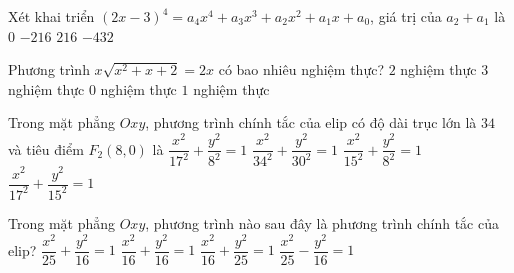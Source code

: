 \begin{ex}%
	Xét khai triển $(2 x-3)^4=a_4 x^4+a_3 x^3+a_2 x^2+a_1 x+a_0$, giá trị của $a_2+a_1$ là \choice
	{\True $0$}
	{$-216$} 
	{$216$} 
	{$-432$} 
\end{ex}
\begin{ex}%
	Phương trình $x \sqrt{x^2+x+2}=2 x$ có bao nhiêu nghiệm thực? \choice
	{$2$ nghiệm thực}
	{\True $3$ nghiệm thực}
	{$0$ nghiệm thực}
	{$1$ nghiệm thực}
\end{ex}

\begin{ex}%
	Trong mặt phẳng $O x y$, phương trình chính tắc của elip có độ dài trục lớn là $ 34 $ và tiêu điểm $F_2(8,0)$ là
	\choice
	{$\dfrac{x^2}{17^2}+\dfrac{y^2}{8^2}=1$}
	{$\dfrac{x^2}{34^2}+\dfrac{y^2}{30^2}=1$}
	{$\dfrac{x^2}{15^2}+\dfrac{y^2}{8^2}=1$}
	{\True$\dfrac{x^2}{17^2}+\dfrac{y^2}{15^2}=1$}
\end{ex}


\begin{ex}%
	Trong mặt phẳng $O x y$, phương trình nào sau đây là phương trình chính tắc của elip?
	\choice
	{\True$\dfrac{x^2}{25}+\dfrac{y^2}{16}=1$}
	{$\dfrac{x^2}{16}+\dfrac{y^2}{16}=1$}
	{$\dfrac{x^2}{16}+\dfrac{y^2}{25}=1$}
	{$\dfrac{x^2}{25}-\dfrac{y^2}{16}=1$}
	
\end{ex}


